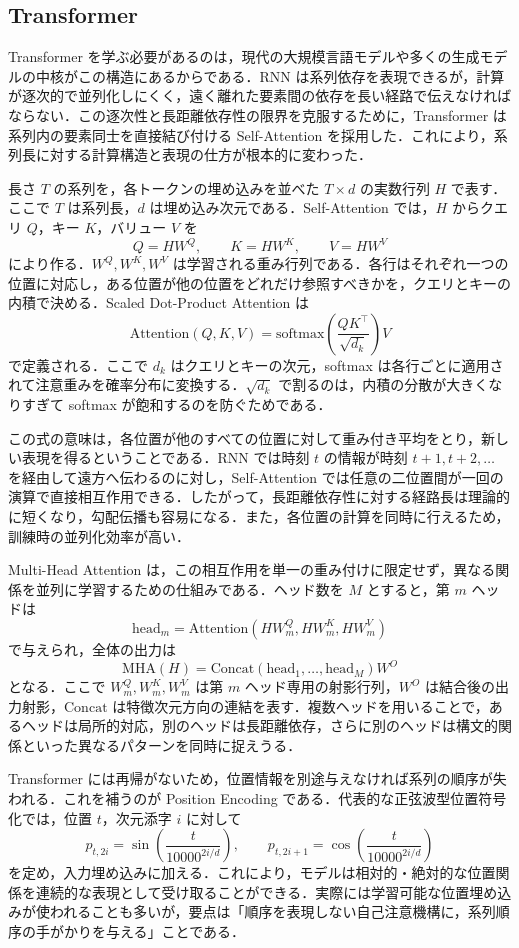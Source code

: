 \subsection{Transformer}
Transformer を学ぶ必要があるのは，現代の大規模言語モデルや多くの生成モデルの中核がこの構造にあるからである．RNN は系列依存を表現できるが，計算が逐次的で並列化しにくく，遠く離れた要素間の依存を長い経路で伝えなければならない．この逐次性と長距離依存性の限界を克服するために，Transformer は系列内の要素同士を直接結び付ける Self-Attention を採用した．これにより，系列長に対する計算構造と表現の仕方が根本的に変わった．

長さ $T$ の系列を，各トークンの埋め込みを並べた $T\times d$ の実数行列 $H$ で表す．ここで $T$ は系列長，$d$ は埋め込み次元である．Self-Attention では，$H$ からクエリ $Q$，キー $K$，バリュー $V$ を
\[
Q=HW^Q,\qquad K=HW^K,\qquad V=HW^V
\]
により作る．$W^Q,W^K,W^V$ は学習される重み行列である．各行はそれぞれ一つの位置に対応し，ある位置が他の位置をどれだけ参照すべきかを，クエリとキーの内積で決める．Scaled Dot-Product Attention は
\[
\mathrm{Attention}(Q,K,V)
= \mathrm{softmax}\left(\frac{QK^\top}{\sqrt{d_k}}\right)V
\]
で定義される．ここで $d_k$ はクエリとキーの次元，softmax は各行ごとに適用されて注意重みを確率分布に変換する．$\sqrt{d_k}$ で割るのは，内積の分散が大きくなりすぎて softmax が飽和するのを防ぐためである．

この式の意味は，各位置が他のすべての位置に対して重み付き平均をとり，新しい表現を得るということである．RNN では時刻 $t$ の情報が時刻 $t+1,t+2,\dots$ を経由して遠方へ伝わるのに対し，Self-Attention では任意の二位置間が一回の演算で直接相互作用できる．したがって，長距離依存性に対する経路長は理論的に短くなり，勾配伝播も容易になる．また，各位置の計算を同時に行えるため，訓練時の並列化効率が高い．

Multi-Head Attention は，この相互作用を単一の重み付けに限定せず，異なる関係を並列に学習するための仕組みである．ヘッド数を $M$ とすると，第 $m$ ヘッドは
\[
\mathrm{head}_m
= \mathrm{Attention}(HW_m^Q,HW_m^K,HW_m^V)
\]
で与えられ，全体の出力は
\[
\mathrm{MHA}(H)
= \mathrm{Concat}(\mathrm{head}_1,\dots,\mathrm{head}_M)W^O
\]
となる．ここで $W_m^Q,W_m^K,W_m^V$ は第 $m$ ヘッド専用の射影行列，$W^O$ は結合後の出力射影，$\mathrm{Concat}$ は特徴次元方向の連結を表す．複数ヘッドを用いることで，あるヘッドは局所的対応，別のヘッドは長距離依存，さらに別のヘッドは構文的関係といった異なるパターンを同時に捉えうる．

Transformer には再帰がないため，位置情報を別途与えなければ系列の順序が失われる．これを補うのが Position Encoding である．代表的な正弦波型位置符号化では，位置 $t$，次元添字 $i$ に対して
\[
p_{t,2i} = \sin\left(\frac{t}{10000^{2i/d}}\right),
\qquad
p_{t,2i+1} = \cos\left(\frac{t}{10000^{2i/d}}\right)
\]
を定め，入力埋め込みに加える．これにより，モデルは相対的・絶対的な位置関係を連続的な表現として受け取ることができる．実際には学習可能な位置埋め込みが使われることも多いが，要点は「順序を表現しない自己注意機構に，系列順序の手がかりを与える」ことである．

